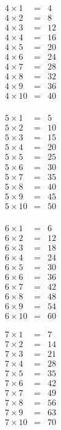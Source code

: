 \begin{footnotesize}
\begin{multicols}{5}
\begin{eqnarray*}
4 \times 1 &=& 4\\
4 \times 2 &=& 8\\
4 \times 3 &=& 12\\
4 \times 4 &=& 16\\
4 \times 5 &=& 20\\
4 \times 6 &=& 24\\
4 \times 7 &=& 28\\
4 \times 8 &=& 32\\
4 \times 9 &=& 36\\
4 \times 10 &=& 40\\
\end{eqnarray*}

\begin{eqnarray*}
5 \times 1 &=& 5\\
5 \times 2 &=& 10\\
5 \times 3 &=& 15\\
5 \times 4 &=& 20\\
5 \times 5 &=& 25\\
5 \times 6 &=& 30\\
5 \times 7 &=& 35\\
5 \times 8 &=& 40\\
5 \times 9 &=& 45\\
5 \times 10 &=& 50\\
\end{eqnarray*}
\end{multicols}

\begin{multicols}{5}
\begin{eqnarray*}
6 \times 1 &=& 6\\
6 \times 2 &=& 12\\
6 \times 3 &=& 18\\
6 \times 4 &=& 24\\
6 \times 5 &=& 30\\
6 \times 6 &=& 36\\
6 \times 7 &=& 42\\
6 \times 8 &=& 48\\
6 \times 9 &=& 54\\
6 \times 10 &=& 60
\end{eqnarray*}

\begin{eqnarray*}
7 \times 1 &=& 7\\
7 \times 2 &=& 14\\
7 \times 3 &=& 21\\
7 \times 4 &=& 28\\
7 \times 5 &=& 35\\
7 \times 6 &=& 42\\
7 \times 7 &=& 49\\
7 \times 8 &=& 56\\
7 \times 9 &=& 63\\
7 \times 10 &=& 70
\end{eqnarray*}


\end{multicols}
\end{footnotesize}
